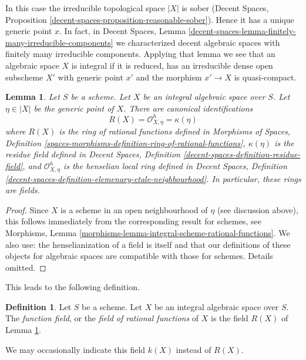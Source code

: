 \documentclass{stacks-project}
\theoremstyle{plain}
\newtheorem{lemma}[subsection]{Lemma}
\theoremstyle{definition}
\newtheorem{definition}[subsection]{Definition}
\theoremstyle{remark}
\numberwithin{equation}{subsection}
\begin{document}
\noindent
In this case the irreducible topological space $|X|$ is sober
(Decent Spaces, Proposition \ref{decent-spaces-proposition-reasonable-sober}).
Hence it has a unique generic point $x$. In fact, in
Decent Spaces, Lemma
\ref{decent-spaces-lemma-finitely-many-irreducible-components}
we characterized decent algebraic spaces with finitely many
irreducible components. Applying that lemma we see that an
algebraic space $X$ is integral if it is
reduced, has an irreducible dense open subscheme $X'$
with generic point $x'$ and the morphism $x' \to X$ is quasi-compact.

\begin{lemma}
\label{lemma-integral-algebraic-space-rational-functions}
Let $S$ be a scheme. Let $X$ be an integral algebraic space over $S$.
Let $\eta \in |X|$ be the generic point of $X$.
There are canonical identifications
$$
R(X) = \mathcal{O}_{X, \eta}^h = \kappa(\eta)
$$
where $R(X)$ is the ring of rational functions defined in
Morphisms of Spaces, Definition
\ref{spaces-morphisms-definition-ring-of-rational-functions},
$\kappa(\eta)$ is the residue field defined in
Decent Spaces, Definition \ref{decent-spaces-definition-residue-field},
and $\mathcal{O}_{X, \eta}^h$ is the henselian local ring defined in
Decent Spaces, Definition
\ref{decent-spaces-definition-elemenary-etale-neighbourhood}.
In particular, these rings are fields.
\end{lemma}

\begin{proof}
Since $X$ is a scheme in an open neighbourhood of $\eta$ (see discussion
above), this follows immediately from the corresponding result for
schemes, see Morphisms, Lemma
\ref{morphisms-lemma-integral-scheme-rational-functions}.
We also use: the henselianization of a field is itself
and that our definitions of these objects
for algebraic spaces are compatible with those for schemes.
Details omitted.
\end{proof}

\noindent
This leads to the following definition.

\begin{definition}
\label{definition-function-field}
Let $S$ be a scheme. Let $X$ be an integral algebraic space over $S$.
The {\it function field}, or the {\it field of rational functions}
of $X$ is the field $R(X)$ of
Lemma \ref{lemma-integral-algebraic-space-rational-functions}.
\end{definition}

\noindent
We may occasionally indicate this field $k(X)$ instead of $R(X)$.
\end{document}
